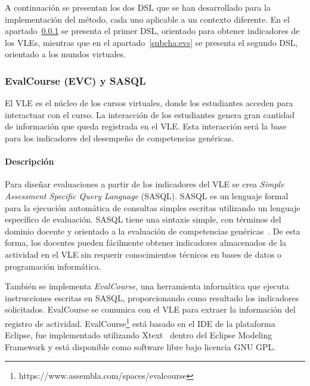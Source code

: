 		A continuación se presentan los dos DSL que se han desarrollado para la implementación del método, cada uno aplicable a un contexto diferente. En el apartado~\ref{subcha:evc} se presenta el primer DSL, orientado para obtener indicadores de los VLEs, mientras que en el apartado~\ref{subcha:evs} se presenta el segundo DSL, orientado a los mundos virtuales. 

		\subsubsection{EvalCourse (EVC) y SASQL} \label{subcha:evc}



	El VLE es el núcleo de los cursos virtuales, donde los estudiantes acceden para interactuar con el curso. La interacción de los estudiantes genera gran cantidad de información que queda registrada en el VLE. Esta interacción será la base para los indicadores del desempeño de competencias genéricas.

			\paragraph{Descripción} %

			Para diseñar evaluaciones a partir de los indicadores del VLE se crea \emph{Simple Assessment Specific Query Language} (SASQL). SASQL es un lenguaje formal para la ejecución automática de consultas simples escritas utilizando un lenguaje específico de evaluación. SASQL tiene una sintaxis simple, con términos del dominio docente y orientado a la evaluación de competencias genéricas~\cite{Balderas:2013}. De esta forma, los docentes pueden fácilmente obtener indicadores almacenados de la actividad en el VLE sin requerir conocimientos técnicos en bases de datos o programación informática.

			También se implementa \emph{EvalCourse}, una herramienta informática que ejecuta instrucciones escritas en SASQL, proporcionando como resultado los indicadores solicitados. EvalCourse se comunica con el VLE para extraer la información del registro de actividad. EvalCourse\footnote{https://www.assembla.com/spaces/evalcourse} está basado en el IDE de la plataforma Eclipse, fue implementado utilizando Xtext~\cite{eysholdt2010xtext} dentro del Eclipse Modeling Framework y está disponible como software libre bajo licencia GNU GPL.

